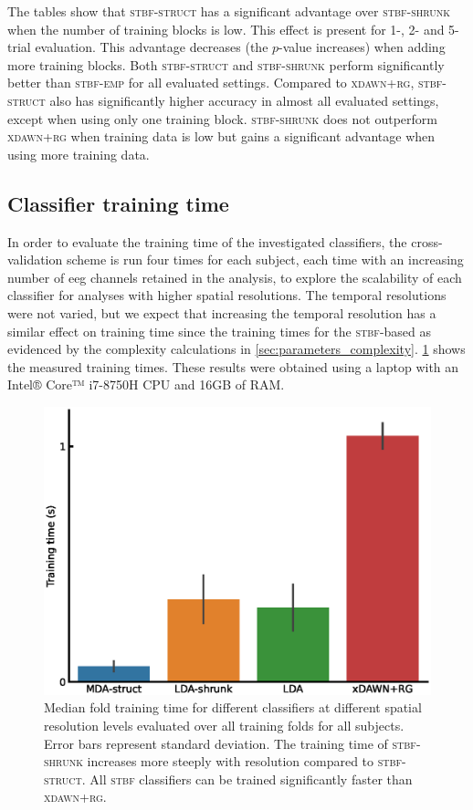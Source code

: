 	The tables show that \textsc{stbf-struct} has a significant advantage over
	\textsc{stbf-shrunk} when the number of training blocks is low.
	This effect is present for 1-, 2- and 5-trial evaluation.
	This advantage decreases (the $p$-value increases) when
	adding more training blocks.
	Both \textsc{stbf-struct} and \textsc{stbf-shrunk} perform significantly better
	than \textsc{stbf-emp} for all evaluated settings.
	Compared to \textsc{xdawn+rg}, \textsc{stbf-struct} also has significantly
	higher accuracy in almost all evaluated settings, except when using only one training block.
	\textsc{stbf-shrunk} does not outperform \textsc{xdawn+rg} when training data is low but gains a significant advantage
	when using more training data.

	\subsection{Classifier training time}
	In order to evaluate the training time of the investigated classifiers, the
	cross-validation scheme is run four times for each subject, each time with an
	increasing number of \ac{eeg} channels retained in the analysis, to explore the scalability of each classifier for analyses with higher spatial resolutions.
	The temporal resolutions were not varied, but we expect that increasing the
	temporal resolution has a similar effect on training time since the
	training times for the \textsc{stbf}-based as evidenced by the complexity
	calculations in \cref{sec:parameters_complexity}.
	\cref{fig:training_time} shows the measured training times.
	These results were obtained using a laptop with an Intel® Core™ i7-8750H CPU and 16GB of RAM.

	\begin{figure}
		\includegraphics[width=.66\linewidth]{figures/stbf_struct/training_time.eps}
    \caption[Classifier training time.]{Median fold training time for different classifiers at different spatial
			resolution levels evaluated over all training folds for all subjects.
			Error bars represent standard deviation. The training time of \textsc{stbf-shrunk} increases more
			steeply with resolution compared to \textsc{stbf-struct}.
			All \textsc{stbf} classifiers can be trained significantly faster than
			\textsc{xdawn+rg}.}
		\label{fig:training_time}
	\end{figure}

